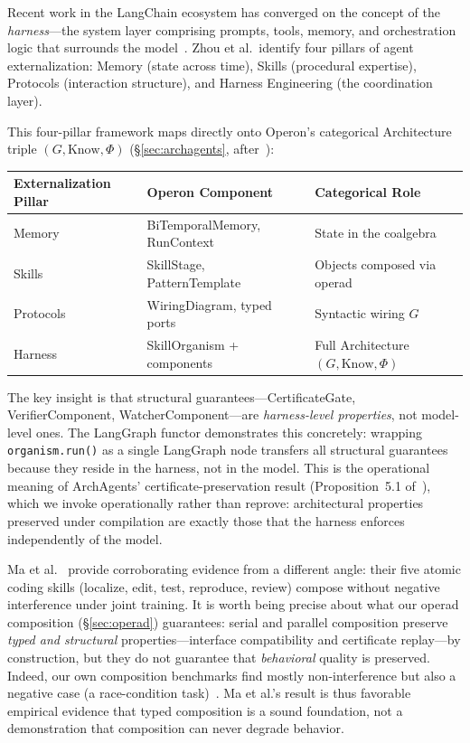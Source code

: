 Recent work in the LangChain ecosystem has converged on the concept of the \emph{harness}---the system layer comprising prompts, tools, memory, and orchestration logic that surrounds the model~\cite{zhou2026externalization}.  Zhou et al.\ identify four pillars of agent externalization: Memory (state across time), Skills (procedural expertise), Protocols (interaction structure), and Harness Engineering (the coordination layer).

This four-pillar framework maps directly onto Operon's categorical Architecture triple $(G, \mathrm{Know}, \Phi)$ (\S\ref{sec:archagents}, after~\cite{delosriscos2026categorical}):

\begin{center}
\small
\begin{tabular}{@{}lll@{}}
\toprule
\textbf{Externalization Pillar} & \textbf{Operon Component} & \textbf{Categorical Role} \\
\midrule
Memory & BiTemporalMemory, RunContext & State in the coalgebra \\
Skills & SkillStage, PatternTemplate & Objects composed via operad \\
Protocols & WiringDiagram, typed ports & Syntactic wiring $G$ \\
Harness & SkillOrganism + components & Full Architecture $(G, \mathrm{Know}, \Phi)$ \\
\bottomrule
\end{tabular}
\end{center}

The key insight is that structural guarantees---CertificateGate, VerifierComponent, WatcherComponent---are \emph{harness-level properties}, not model-level ones.  The LangGraph functor demonstrates this concretely: wrapping \texttt{organism.run()} as a single LangGraph node transfers all structural guarantees because they reside in the harness, not in the model.  This is the operational meaning of ArchAgents' certificate-preservation result (Proposition~5.1 of~\cite{delosriscos2026categorical}), which we invoke operationally rather than reprove: architectural properties preserved under compilation are exactly those that the harness enforces independently of the model.

Ma et al.~\cite{ma2026atomic} provide corroborating evidence from a different angle: their five atomic coding skills (localize, edit, test, reproduce, review) compose without negative interference under joint training.  It is worth being precise about what our operad composition (\S\ref{sec:operad}) guarantees: serial and parallel composition preserve \emph{typed and structural} properties---interface compatibility and certificate replay---by construction, but they do not guarantee that \emph{behavioral} quality is preserved.  Indeed, our own composition benchmarks find mostly non-interference but also a negative case (a race-condition task)~\cite{banu2026benchmarks}.  Ma et al.'s result is thus favorable empirical evidence that typed composition is a sound foundation, not a demonstration that composition can never degrade behavior.

